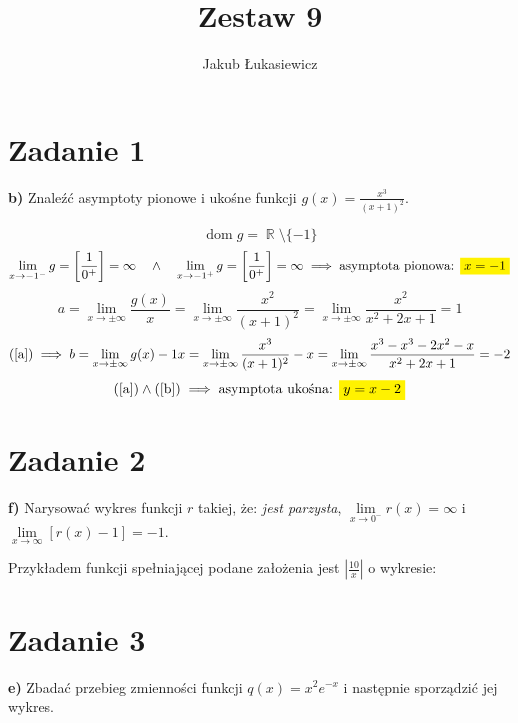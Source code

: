\documentclass[12pt]{article}
\title{Zestaw 9}
\author{Jakub Łukasiewicz}
\date{}
\newcommand{\ex}[1]{\textbf{ #1)}}
\newcommand{\task}[1]{\section*{Zadanie #1}}
\newcommand{\mathcolorbox}[2]{\colorbox{#1}{$\displaystyle #2$}}
\let\oldref\ref
\renewcommand{\ref}[1]{(\oldref{#1})}
\DeclareMathOperator{\dom}{dom}
\DeclareMathOperator{\R}{\mathbb{R}}
\begin{document}
\maketitle

\task{1}\ex{b}
Znaleźć asymptoty pionowe i ukośne funkcji $g(x) = \frac{x^3}{(x+1)^2}$.

$$ \dom{g} = \R \setminus \{-1\} $$
\begin{equation*}
    \lim_{x \to -1^-}{g} = \left[ \frac{1}{0^+} \right] = \infty
    \quad\land\quad
    \lim_{x \to -1^+}{g} = \left[ \frac{1}{0^+} \right] = \infty
    \implies \textrm{asymptota pionowa: } \mathcolorbox{yellow}{x = -1}
\end{equation*}
\begin{equation} \label{a}
    a = \lim_{x \to \pm\infty}{\frac{g(x)}{x}} = \lim_{x \to \pm\infty}{\frac{x^2}{(x+1)^2}}
    = \lim_{x \to \pm\infty}{\frac{x^2}{x^2 + 2x + 1}} = 1
\end{equation}
\begin{equation} \label{b}
    \ref{a} \implies b = \lim_{x \to \pm\infty}{g(x) - 1x}
    = \lim_{x \to \pm\infty}{\frac{x^3}{(x+1)^2} - x}
    = \lim_{x \to \pm\infty}{\frac{x^3 - x^3 - 2x^2 - x}{x^2 + 2x + 1}} = -2
\end{equation}
$$ \ref{a} \land \ref{b} \implies \textrm{asymptota ukośna: } \mathcolorbox{yellow}{y = x - 2} $$

\task{2}\ex{f}
Narysować wykres funkcji $r$ takiej, że: \textit{jest parzysta}, $\lim\limits_{x \to 0^-}{r(x)} = \infty$
i $\lim\limits_{x \to \infty}{[r(x) - 1]} = -1$.

Przykładem funkcji spełniającej podane założenia jest $ \left| \frac{10}{x} \right| $ o wykresie:

\begin{figure}[h!]
    \centering
\end{figure}

\newpage

\setcounter{equation}{0}
\task{3}\ex{e}
Zbadać przebieg zmienności funkcji $q(x) = x^2 e^{-x}$ i następnie sporządzić jej wykres.
\end{document}
